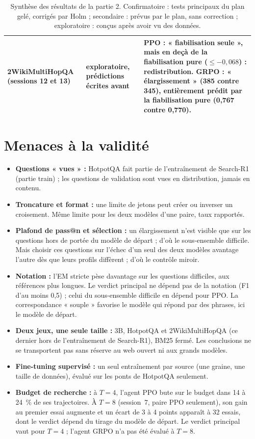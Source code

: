 \begin{table}[h]
\begin{tabular}{>{\raggedright\arraybackslash}p{3.6cm}>{\raggedright\arraybackslash}p{1.9cm}>{\raggedright\arraybackslash}p{8.6cm}}
2WikiMultiHopQA (sessions 12 et 13) & exploratoire, prédictions écrites avant & PPO : « fiabilisation seule », mais en deçà de la fiabilisation pure ($\leq -0{,}068$) : redistribution. GRPO : « élargissement » (385 contre 345), entièrement prédit par la fiabilisation pure (0,767 contre 0,770). \\
\bottomrule
\end{tabular}
\caption{Synthèse des résultats de la partie 2. Confirmatoire : tests principaux du plan gelé, corrigés par Holm ; secondaire : prévus par le plan, sans correction ; exploratoire : conçus après avoir vu des données.}\label{tab:synthese-p2}
\end{table}

\section{Menaces à la validité}

\begin{itemize}
\item \textbf{Questions « vues » :} HotpotQA fait partie de l'entraînement de Search-R1 (partie train) ; les questions de validation sont vues en distribution, jamais en contenu.
\item \textbf{Troncature et format :} une limite de jetons peut créer ou inverser un croisement. Même limite pour les deux modèles d'une paire, taux rapportés.
\item \textbf{Plafond de pass@n et sélection :} un élargissement n'est visible que sur les questions hors de portée du modèle de départ ; d'où le sous-ensemble difficile. Mais choisir ces questions sur l'échec d'un seul des deux modèles avantage l'autre dès que leurs profils diffèrent ; d'où le contrôle miroir.
\item \textbf{Notation :} l'EM stricte pèse davantage sur les questions difficiles, aux références plus longues. Le verdict principal ne dépend pas de la notation (F1 d'au moins 0,5) ; celui du sous-ensemble difficile en dépend pour PPO. La correspondance « souple » favorise le modèle qui répond par des phrases, ici le modèle de départ.
\item \textbf{Deux jeux, une seule taille :} 3B, HotpotQA et 2WikiMultiHopQA (ce dernier hors de l'entraînement de Search-R1), BM25 fermé. Les conclusions ne se transportent pas sans réserve au web ouvert ni aux grands modèles.
\item \textbf{Fine-tuning supervisé :} un seul entraînement par source (une graine, une taille de données), évalué sur les ponts de HotpotQA seulement.
\item \textbf{Budget de recherche :} à $T = 4$, l'agent PPO bute sur le budget dans 14 à 24~\% de ses trajectoires. À $T = 8$ (session~7, paire PPO seulement), son gain au premier essai augmente et un écart de 3 à 4 points apparaît à 32 essais, dont le verdict dépend du tirage du modèle de départ. Le verdict principal vaut pour $T = 4$ ; l'agent GRPO n'a pas été évalué à $T = 8$.
\end{itemize}

